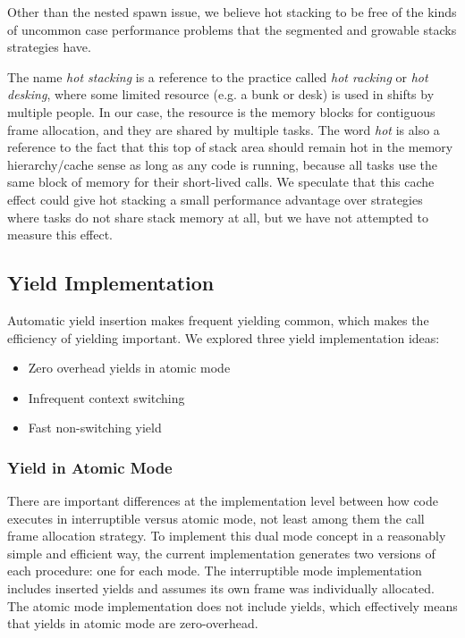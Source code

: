 \documentclass[acmsmall,anonymous,review]{acmart}\settopmatter{printfolios=true,printccs=false,printacmref=false}
\begin{document}
Other than the nested spawn issue, we believe hot stacking to be free of the kinds of uncommon case performance problems that the segmented and growable stacks strategies have.

The name \emph{hot stacking} is a reference to the practice called \emph{hot racking} or \emph{hot desking}, where some limited resource (e.g. a bunk or desk) is used in shifts by multiple people.
In our case, the resource is the memory blocks for contiguous frame allocation, and they are shared by multiple tasks.
The word \emph{hot} is also a reference to the fact that this top of stack area should remain hot in the memory hierarchy/cache sense as long as any code is running, because all tasks use the same block of memory for their short-lived calls.
We speculate that this cache effect could give hot stacking a small performance advantage over strategies where tasks do not share stack memory at all, but we have not attempted to measure this effect.


\subsection{Yield Implementation}
\label{sec:yield_imp}

Automatic yield insertion makes frequent yielding common, which makes the efficiency of yielding important.
We explored three yield implementation ideas:

\begin{itemize}
\item Zero overhead yields in atomic mode
\item Infrequent context switching
\item Fast non-switching yield
\end{itemize}

\subsubsection{Yield in Atomic Mode}

There are important differences at the implementation level between how code executes in interruptible versus atomic mode, not least among them the call frame allocation strategy.
To implement this dual mode concept in a reasonably simple and efficient way, the current \charcoal{} implementation generates two versions of each procedure: one for each mode.
The interruptible mode implementation includes inserted yields and assumes its own frame was individually allocated.
The atomic mode implementation does not include yields, which effectively means that yields in atomic mode are zero-overhead.
\end{document}
